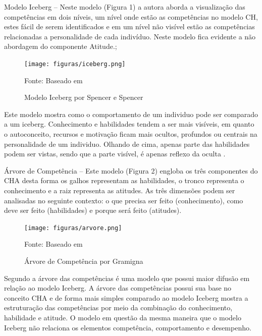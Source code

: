 \begin{alineas}
	\item Modelo Iceberg  – Neste modelo (Figura 1) a autora aborda a visualização das competências em dois níveis, um nível onde estão as competências no modelo CH, estes fácil de serem identificados e em um nível não visível estão as competências relacionadas a personalidade de cada indivíduo. Neste modelo fica evidente a não abordagem do componente Atitude.;

	\begin{figure}[htbp]
		\centering
		\caption{Modelo Iceberg por Spencer e Spencer}
		\texttt{[image: figuras/iceberg.png]}

		\label{fig:ICEBERG}
		\footnotesize Fonte: Baseado em 
	\end{figure}
	 \vspace{5mm}

Este modelo mostra como o comportamento de um individuo pode ser comparado a um iceberg. Conhecimento e habilidades tendem a ser mais visíveis, em quanto o autoconceito, recursos e motivação ficam mais ocultos, profundos ou centrais na personalidade de um individuo. Olhando de cima, apenas parte das habilidades podem ser vistas, sendo que a parte visível, é apenas reflexo da oculta \cite{Molina2010}.

	\item Árvore de Competência  – Este modelo (Figura 2) engloba os três componentes do CHA desta forma os galhos representam as habilidades, o tronco representa o conhecimento e a raiz representa as atitudes. As três dimensões podem ser analisadas no seguinte contexto: o que precisa ser feito (conhecimento), como deve ser feito (habilidades) e porque será feito (atitudes).

	\vspace{30mm}

	\begin{figure}[htbp]
		\centering
		\caption{Árvore de Competência por Gramigna}
		\texttt{[image: figuras/arvore.png]}

		\label{fig:ARVORE}
		\footnotesize Fonte: Baseado em 
	\end{figure}

Segundo  a árvore das competências é uma modelo que possui maior difusão em relação ao modelo Iceberg. A árvore das competências possui sua base no conceito CHA e de forma mais simples comparado ao modelo Iceberg mostra a estruturação das competências por meio da combinação do conhecimento, habilidade e atitude. O modelo em questão da mesma maneira que o modelo Iceberg não relaciona os elementos  competência, comportamento e desempenho.


\end{alineas}
